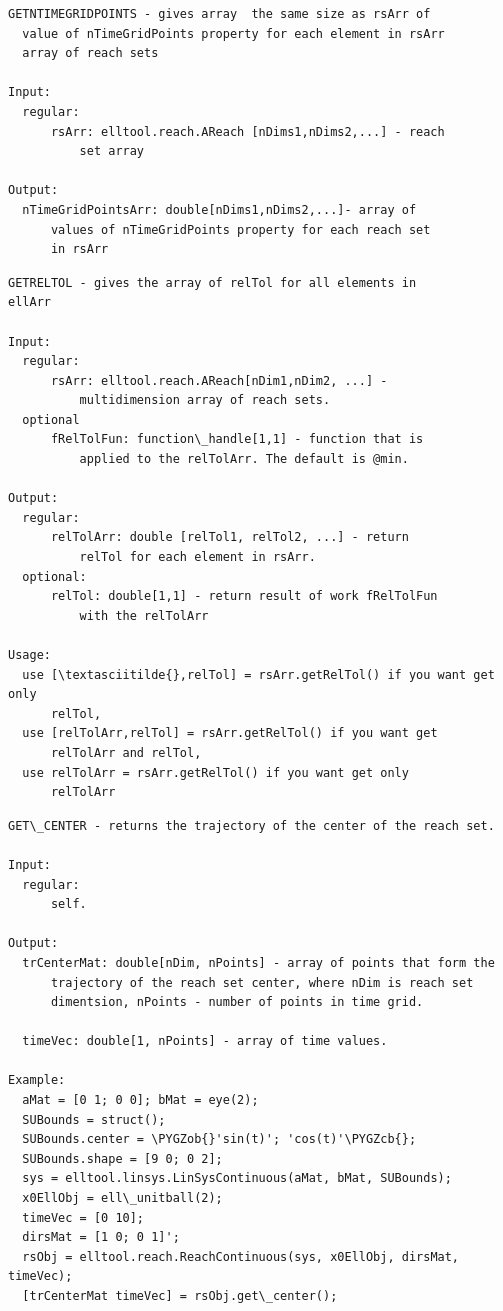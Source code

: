 \documentclass[letterpaper,10pt,english]{sphinxmanual}
\def\PYGZob{\char`\{}
\def\PYGZcb{\char`\}}
\begin{document}
\begin{Verbatim}[commandchars=\\\{\}]
GETNTIMEGRIDPOINTS - gives array  the same size as rsArr of
  value of nTimeGridPoints property for each element in rsArr
  array of reach sets

Input:
  regular:
      rsArr: elltool.reach.AReach [nDims1,nDims2,...] - reach
          set array

Output:
  nTimeGridPointsArr: double[nDims1,nDims2,...]- array of
      values of nTimeGridPoints property for each reach set
      in rsArr
\end{Verbatim}

\begin{Verbatim}[commandchars=\\\{\}]
GETRELTOL - gives the array of relTol for all elements in
ellArr

Input:
  regular:
      rsArr: elltool.reach.AReach[nDim1,nDim2, ...] -
          multidimension array of reach sets.
  optional
      fRelTolFun: function\_handle[1,1] - function that is
          applied to the relTolArr. The default is @min.

Output:
  regular:
      relTolArr: double [relTol1, relTol2, ...] - return
          relTol for each element in rsArr.
  optional:
      relTol: double[1,1] - return result of work fRelTolFun
          with the relTolArr

Usage:
  use [\textasciitilde{},relTol] = rsArr.getRelTol() if you want get only
      relTol,
  use [relTolArr,relTol] = rsArr.getRelTol() if you want get
      relTolArr and relTol,
  use relTolArr = rsArr.getRelTol() if you want get only
      relTolArr
\end{Verbatim}

\begin{Verbatim}[commandchars=\\\{\}]
GET\_CENTER - returns the trajectory of the center of the reach set.

Input:
  regular:
      self.

Output:
  trCenterMat: double[nDim, nPoints] - array of points that form the
      trajectory of the reach set center, where nDim is reach set
      dimentsion, nPoints - number of points in time grid.

  timeVec: double[1, nPoints] - array of time values.

Example:
  aMat = [0 1; 0 0]; bMat = eye(2);
  SUBounds = struct();
  SUBounds.center = \PYGZob{}'sin(t)'; 'cos(t)'\PYGZcb{};
  SUBounds.shape = [9 0; 0 2];
  sys = elltool.linsys.LinSysContinuous(aMat, bMat, SUBounds);
  x0EllObj = ell\_unitball(2);
  timeVec = [0 10];
  dirsMat = [1 0; 0 1]';
  rsObj = elltool.reach.ReachContinuous(sys, x0EllObj, dirsMat, timeVec);
  [trCenterMat timeVec] = rsObj.get\_center();
\end{Verbatim}
\end{document}
